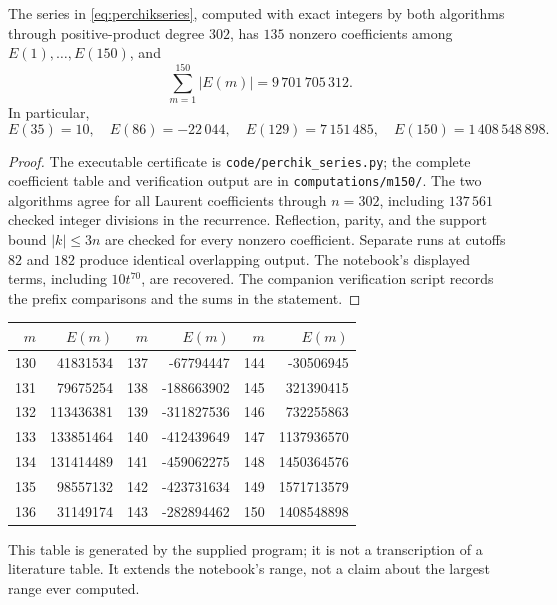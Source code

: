 \begin{proposition}[Finite output through \(m=150\)]\oursComputed\quad
The series in \eqref{eq:perchikseries}, computed with exact integers by
both algorithms through positive-product degree \(302\), has
\(135\) nonzero coefficients among \(E(1),\ldots,E(150)\), and
\[
 \sum_{m=1}^{150}|E(m)|=9\,701\,705\,312.
\]
In particular,
\[
 E(35)=10,\quad E(86)=-22\,044,\quad
 E(129)=7\,151\,485,\quad E(150)=1\,408\,548\,898.
\]
\end{proposition}
\begin{proof}
The executable certificate is \texttt{code/perchik\_series.py}; the complete
coefficient table and verification output are in
\texttt{computations/m150/}. The two algorithms agree for all Laurent
coefficients through \(n=302\), including \(137\,561\) checked integer
divisions in the recurrence. Reflection, parity, and the support bound
\(|k|\leq3n\) are checked for every nonzero coefficient. Separate runs
at cutoffs \(82\) and \(182\) produce identical overlapping output.
The notebook's displayed terms, including \(10t^{70}\), are recovered.
The companion verification script records the prefix comparisons and
the sums in the statement.
\end{proof}

\begin{center}
\begin{tabular}{rr@{\qquad}rr@{\qquad}rr}
\toprule
\(m\)&\(E(m)\)&\(m\)&\(E(m)\)&\(m\)&\(E(m)\)\\
\midrule
130&41831534&137&-67794447&144&-30506945\\
131&79675254&138&-188663902&145&321390415\\
132&113436381&139&-311827536&146&732255863\\
133&133851464&140&-412439649&147&1137936570\\
134&131414489&141&-459062275&148&1450364576\\
135&98557132&142&-423731634&149&1571713579\\
136&31149174&143&-282894462&150&1408548898\\
\bottomrule
\end{tabular}
\end{center}
This table is generated by the supplied program; it is not a transcription
of a literature table. It extends the notebook's range, not a claim about
the largest range ever computed.

